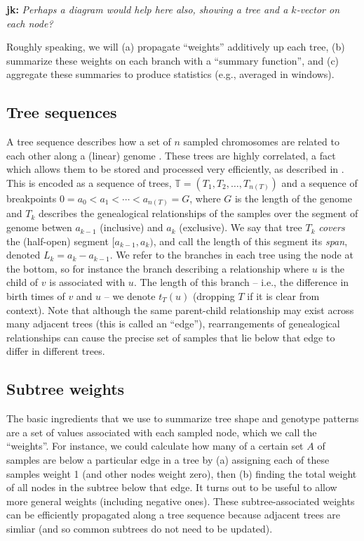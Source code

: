 \documentclass{article}
\newcommand{\treeseq}{\mathbb{T}} %
\newcommand{\jk}[1]{{\color{red}\textbf{jk:} \it #1}}
\begin{document}
\jk{Perhaps a diagram would help here also, showing a tree and a $k$-vector on each
node?}

Roughly speaking, we will 
(a) propagate ``weights'' additively up each tree,
(b) summarize these weights on each branch with a ``summary function'',
and (c) aggregate these summaries to produce statistics
(e.g., averaged in windows).


\subsection*{Tree sequences}

A tree sequence describes how a set of $n$ sampled chromosomes
are related to each other along a (linear) genome \citep{kelleher2016efficient}.
These trees are highly correlated,
a fact which allows them to be stored and processed very efficiently,
as described in \citet{kelleher2018efficient}.
This is encoded as a sequence of trees, $\treeseq = (T_1, T_2, \ldots, T_{n(T)})$
and a sequence of breakpoints $0 = a_0 < a_1 < \cdots < a_{n(T)} = G$,
where $G$ is the length of the genome
and $T_k$ describes the genealogical relationships of the samples
over the segment of genome betwen $a_{k-1}$ (inclusive) and $a_k$ (exclusive).
We say that tree $T_k$ \emph{covers} the (half-open) segment $[a_{k-1}, a_k)$,
and call the length of this segment its \emph{span}, denoted $L_k = a_k - a_{k-1}$.
We refer to the branches in each tree using the node at the bottom,
so for instance the branch describing a relationship where $u$ is the child of $v$
is associated with $u$.
The length of this branch -- i.e., the difference in birth times of $v$ and $u$ --
we denote $t_T(u)$ (dropping $T$ if it is clear from context).
Note that although the same parent-child relationship may exist across many adjacent trees
(this is called an ``edge''),
rearrangements of genealogical relationships
can cause the precise set of samples that lie below that edge to differ in different trees.



\subsection*{Subtree weights}

The basic ingredients that we use to summarize tree shape and genotype patterns
are a set of values associated with each sampled node, which we call the ``weights''.
For instance, we could calculate how many of a certain set $A$ of samples 
are below a particular edge in a tree
by (a) assigning each of these samples weight 1 (and other nodes weight zero), then
(b) finding the total weight of all nodes in the subtree below that edge.
It turns out to be useful to allow more general weights (including negative ones).
These subtree-associated weights can be efficiently propagated along a tree sequence
because adjacent trees are simliar (and so common subtrees do not need to be updated).
\end{document}
